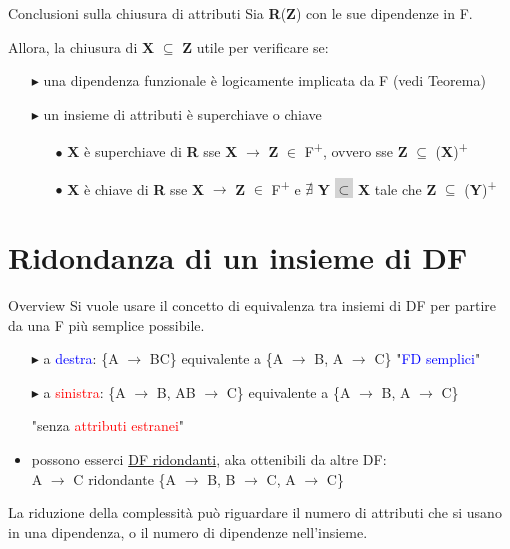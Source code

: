 \documentclass{beamer}
\begin{document}
\begin{frame}{Conclusioni sulla chiusura di attributi}
    Sia \textbf{R}(\textbf{Z}) con le sue dipendenze in F. \par Allora, la chiusura di \textbf{X} $\subseteq$ \textbf{Z} utile per verificare se:
    \begin{itemize}
        \item[$\blacktriangleright$] una dipendenza funzionale è logicamente implicata da F (vedi Teorema)
        \item[$\blacktriangleright$] un insieme di attributi è superchiave o chiave
        \begin{itemize}
            \item[$\bullet$] \textbf{X} è superchiave di \textbf{R} sse \textbf{X} $\rightarrow$ \textbf{Z} $\in$ F\textsuperscript{+}, ovvero sse \textbf{Z} $\subseteq$ (\textbf{X})\textsuperscript{+}
            \item[$\bullet$] \textbf{X} è chiave di \textbf{R} sse \textbf{X} $\rightarrow$ \textbf{Z} $\in$ F\textsuperscript{+} e $\nexists$ \textbf{Y} \colorbox{lightgray}{$\subset$} \textbf{X} tale che \textbf{Z} $\subseteq$ (\textbf{Y})\textsuperscript{+}
        \end{itemize}
    \end{itemize}
\end{frame}


\section{Ridondanza di un insieme di DF}

\begin{frame}{Overview}
    Si vuole usare il concetto di equivalenza tra insiemi di DF per partire da una F più semplice possibile.
    \begin{itemize}
        \item[$\blacktriangleright$] a \textcolor{blue}{destra}:
        \{A $\rightarrow$ BC\} equivalente a \{A $\rightarrow$ B, A $\rightarrow$ C\} "\textcolor{blue}{FD semplici}"
        \item[$\blacktriangleright$] a \textcolor{red}{sinistra}:
        \{A $\rightarrow$ B, AB $\rightarrow$ C\} equivalente a \{A $\rightarrow$ B, A $\rightarrow$ C\} \par
        \hspace{7cm} "senza \textcolor{red}{attributi estranei}"
        \item possono esserci \underline{DF ridondanti}, aka ottenibili da altre DF:\\
        A $\rightarrow$ C ridondante \{A $\rightarrow$ B, B $\rightarrow$ C, A $\rightarrow$ C\}
    \end{itemize}
    \vfill
    \begin{block}{}
    La riduzione della complessità può riguardare il numero di attributi che si usano in una dipendenza, o il numero di dipendenze nell'insieme.
    \end{block}
\end{frame}
\end{document}
